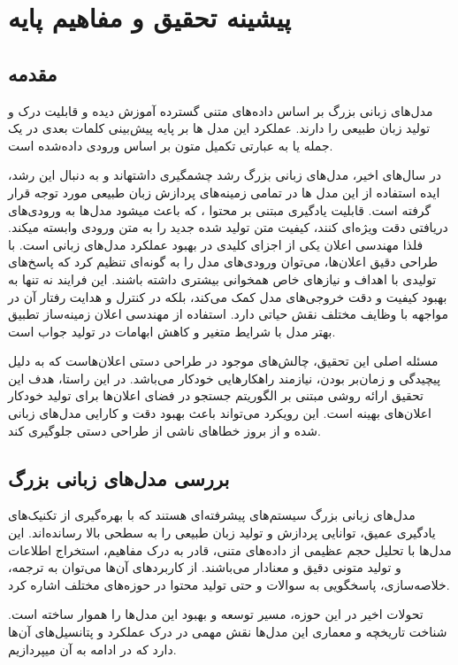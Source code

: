 \clearpage
\thispagestyle{empty}
\chapter{پیشینه تحقیق و مفاهیم پایه}\label{chap2}
\section{مقدمه}
مدل‌های زبانی بزرگ بر اساس داده‌های متنی گسترده آموزش دیده و قابلیت درک و تولید زبان طبیعی را دارند. عملکرد این مدل ها بر پایه پیش‌بینی کلمات بعدی در یک جمله یا به عبارتی تکمیل متون بر اساس ورودی داده‌شده است.  

در سال‌های اخیر، مدل‌های زبانی بزرگ رشد چشمگیری داشته\/اند و به دنبال این رشد، ایده استفاده از این مدل ها در تمامی زمینه‌های پردازش زبان طبیعی مورد توجه قرار گرفته است. قابلیت یادگیری مبتنی بر محتوا
، که باعث میشود مدل‌ها به ورودی‌های دریافتی دقت ویژه‌ای کنند، کیفیت متن تولید شده جدید را به متن ورودی وابسته میکند. فلذا مهندسی اعلان یکی از اجزای کلیدی در بهبود عملکرد مدل‌های زبانی  است. با طراحی دقیق اعلان‌ها، می‌توان ورودی‌های مدل را به گونه‌ای تنظیم کرد که پاسخ‌های تولیدی با اهداف و نیازهای خاص همخوانی بیشتری داشته باشند. این فرایند نه تنها به بهبود کیفیت و دقت خروجی‌های مدل کمک می‌کند، بلکه در کنترل و هدایت رفتار آن در مواجهه با وظایف مختلف نقش حیاتی دارد. استفاده از مهندسی اعلان زمینه‌ساز تطبیق بهتر مدل با شرایط متغیر و کاهش ابهامات در تولید جواب است.

مسئله اصلی این تحقیق، چالش‌های موجود در طراحی دستی اعلان‌هاست که به دلیل پیچیدگی و زمان‌بر بودن، نیازمند راهکارهایی خودکار می‌باشد. در این راستا، هدف این تحقیق ارائه روشی مبتنی بر الگوریتم جستجو در فضای اعلان‌ها برای تولید خودکار اعلان‌های بهینه است. این رویکرد می‌تواند باعث بهبود دقت و کارایی مدل‌های زبانی شده و از بروز خطاهای ناشی از طراحی دستی جلوگیری کند.

\section{بررسی مدل‌های زبانی بزرگ}
مدل‌های زبانی بزرگ سیستم‌های پیشرفته‌ای هستند که با بهره‌گیری از تکنیک‌های یادگیری عمیق، توانایی پردازش و تولید زبان طبیعی را به سطحی بالا رسانده‌اند. این مدل‌ها با تحلیل حجم عظیمی از داده‌های متنی، قادر به درک مفاهیم، استخراج اطلاعات و تولید متونی دقیق و معنادار می‌باشند. از کاربردهای آن‌ها می‌توان به ترجمه، خلاصه‌سازی، پاسخگویی به سوالات و حتی تولید محتوا در حوزه‌های مختلف اشاره کرد.

تحولات اخیر در این حوزه، مسیر توسعه و بهبود این مدل‌ها را هموار ساخته است. شناخت تاریخچه و معماری این مدل‌ها نقش مهمی در درک عملکرد و پتانسیل‌های آن‌ها دارد که در ادامه به آن می\/پردازیم.

